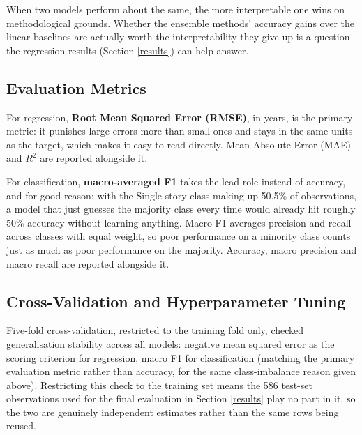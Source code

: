 \documentclass[11pt,a4paper]{article}
\begin{document}
When two models perform about the same, the more interpretable one wins
on methodological grounds. Whether the ensemble methods' accuracy gains
over the linear baselines are actually worth the interpretability they
give up is a question the regression results (Section \ref{results}) can
help answer.

\subsection{Evaluation Metrics}\label{evaluation-metrics}

For regression, \textbf{Root Mean Squared Error (RMSE)}, in years, is
the primary metric: it punishes large errors more than small ones and
stays in the same units as the target, which makes it easy to read
directly. Mean Absolute Error (MAE) and \(R^2\) are reported alongside
it.

For classification, \textbf{macro-averaged F1} takes the lead role
instead of accuracy, and for good reason: with the Single-story class
making up 50.5\% of observations, a model that just guesses the majority
class every time would already hit roughly 50\% accuracy without
learning anything. Macro F1 averages precision and recall across classes
with equal weight, so poor performance on a minority class counts just
as much as poor performance on the majority. Accuracy, macro precision
and macro recall are reported alongside it.

\subsection{Cross-Validation and Hyperparameter
Tuning}\label{cross-validation-and-hyperparameter-tuning}

Five-fold cross-validation, restricted to the training fold only,
checked generalisation stability across all models: negative mean
squared error as the scoring criterion for regression, macro F1 for
classification (matching the primary evaluation metric rather than
accuracy, for the same class-imbalance reason given above). Restricting
this check to the training set means the 586 test-set observations used
for the final evaluation in Section \ref{results} play no part in it, so
the two are genuinely independent estimates rather than the same rows
being reused.
\end{document}
